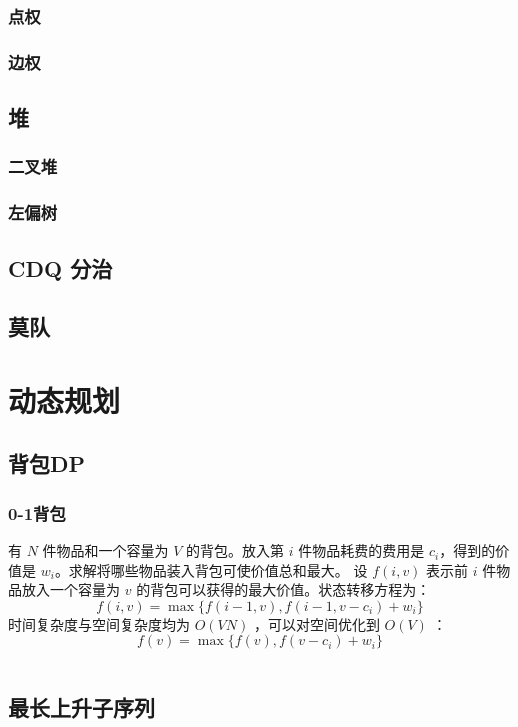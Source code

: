 \documentclass[a4paper, twoside]{article}
\begin{document}
    \subsubsection{点权}

    \subsubsection{边权}

\subsection{堆}
    \subsubsection{二叉堆}
    
    \subsubsection{左偏树}

\subsection{CDQ 分治}

\subsection{莫队}

\newpage
\section{动态规划}
\subsection{背包DP}
    \subsubsection{0-1背包}
    有 $N$ 件物品和一个容量为 $V$ 的背包。放入第 $i$ 件物品耗费的费用是 $c_i$，得到的价值是 $w_i$。求解将哪些物品装入背包可使价值总和最大。
    设 $f(i, v)$ 表示前 $i$ 件物品放入一个容量为 $v$ 的背包可以获得的最大价值。状态转移方程为：
    $$f(i, v)=\max\{f(i-1, v), f(i-1, v-c_i)+ w_i\}$$
    时间复杂度与空间复杂度均为 $O(VN)$ ，可以对空间优化到 $O(V)$ ：
    $$f(v)=\max\{f(v), f(v-c_i)+w_i\}$$
    \inputminted{cpp}{../src/动态规划/0-1背包.cpp}

\subsection{最长上升子序列}
\end{document}
